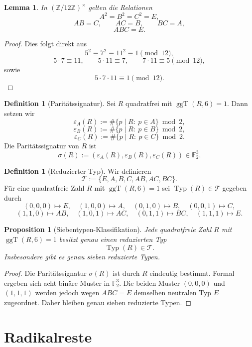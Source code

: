 \documentclass[11pt,a4paper]{article}
\newtheorem{lemma}[satz]{Lemma}
\newtheorem{proposition}[satz]{Proposition}
\theoremstyle{definition}
\newtheorem{definition}[satz]{Definition}
\theoremstyle{remark}
\newcommand{\F}{\mathbb{F}_2}
\newcommand{\Typ}{\operatorname{Typ}}
\newcommand{\ggT}{\operatorname{ggT}}
\newcommand{\epsA}{\varepsilon_A}
\newcommand{\epsB}{\varepsilon_B}
\newcommand{\epsC}{\varepsilon_C}
\begin{document}
	\begin{lemma}
		In \((\mathbb Z/12\mathbb Z)^\times\) gelten die Relationen
		\[
		A^2=B^2=C^2=E,
		\]
		\[
		AB=C,\qquad AC=B,\qquad BC=A,
		\]
		\[
		ABC=E.
		\]
	\end{lemma}
	
	\begin{proof}
		Dies folgt direkt aus
		\[
		5^2\equiv 7^2\equiv 11^2\equiv 1 \pmod{12},
		\]
		\[
		5\cdot 7\equiv 11,\qquad 5\cdot 11\equiv 7,\qquad 7\cdot 11\equiv 5 \pmod{12},
		\]
		sowie
		\[
		5\cdot 7\cdot 11\equiv 1 \pmod{12}.
		\]
	\end{proof}
	
	\begin{definition}[Paritätssignatur]
		Sei \(R\) quadratfrei mit \(\ggT(R,6)=1\). Dann setzen wir
		\[
		\epsA(R):=\#\{p\mid R:\ p\in A\}\bmod 2,
		\]
		\[
		\epsB(R):=\#\{p\mid R:\ p\in B\}\bmod 2,
		\]
		\[
		\epsC(R):=\#\{p\mid R:\ p\in C\}\bmod 2.
		\]
		Die Paritätssignatur von \(R\) ist
		\[
		\sigma(R):=(\epsA(R),\epsB(R),\epsC(R))\in\F^3.
		\]
	\end{definition}
	
	\begin{definition}[Reduzierter Typ]
		Wir definieren
		\[
		\mathcal T:=\{E,A,B,C,AB,AC,BC\}.
		\]
		Für eine quadratfreie Zahl \(R\) mit \(\ggT(R,6)=1\) sei \(\Typ(R)\in\mathcal T\) gegeben durch
		\[
		(0,0,0)\mapsto E,\quad
		(1,0,0)\mapsto A,\quad
		(0,1,0)\mapsto B,\quad
		(0,0,1)\mapsto C,
		\]
		\[
		(1,1,0)\mapsto AB,\quad
		(1,0,1)\mapsto AC,\quad
		(0,1,1)\mapsto BC,\quad
		(1,1,1)\mapsto E.
		\]
	\end{definition}
	
	\begin{proposition}[Siebentypen-Klassifikation]
		Jede quadratfreie Zahl \(R\) mit \(\ggT(R,6)=1\) besitzt genau einen reduzierten Typ
		\[
		\Typ(R)\in\mathcal T.
		\]
		Insbesondere gibt es genau sieben reduzierte Typen.
	\end{proposition}
	
	\begin{proof}
		Die Paritätssignatur \(\sigma(R)\) ist durch \(R\) eindeutig bestimmt. Formal ergeben sich acht
		binäre Muster in \(\F^3\). Die beiden Muster \((0,0,0)\) und \((1,1,1)\) werden jedoch wegen
		\(ABC=E\) demselben neutralen Typ \(E\) zugeordnet. Daher bleiben genau sieben reduzierte Typen.
	\end{proof}
	
	\section{Radikalreste}
	
\end{document}
